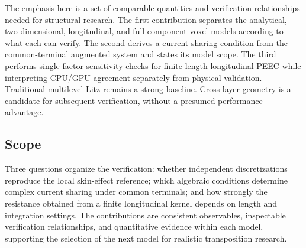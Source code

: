 \documentclass[11pt]{article}
\begin{document}
The emphasis here is a set of comparable quantities and verification relationships needed for structural research. The first contribution separates the analytical, two-dimensional, longitudinal, and full-component voxel models according to what each can verify. The second derives a current-sharing condition from the common-terminal augmented system and states its model scope. The third performs single-factor sensitivity checks for finite-length longitudinal PEEC while interpreting CPU/GPU agreement separately from physical validation. Traditional multilevel Litz remains a strong baseline. Cross-layer geometry is a candidate for subsequent verification, without a presumed performance advantage.


\subsection*{Scope}
\hypertarget{01.scope.heading}{}
Three questions organize the verification: whether independent discretizations reproduce the local skin-effect reference; which algebraic conditions determine complex current sharing under common terminals; and how strongly the resistance obtained from a finite longitudinal kernel depends on length and integration settings. The contributions are consistent observables, inspectable verification relationships, and quantitative evidence within each model, supporting the selection of the next model for realistic transposition research.
\end{document}
